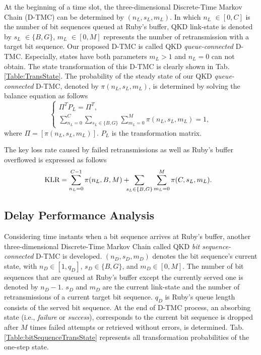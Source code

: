 \documentclass[conference]{IEEEtran}
\begin{document}
At the beginning of a time slot, the three-dimensional Discrete-Time Markov Chain (D-TMC) can be determined by $(n_L,s_L,m_L)$. In which $n_L$ $\in [0,C]$ is the number of bit sequences queued at Ruby's buffer, QKD link-state is denoted by $s_L$ $\in \{ B, G\}$, $m_L$ $\in [0,M]$ represents the number of retransmission with a target bit sequence. Our proposed D-TMC is called QKD \textit{queue-connected} D-TMC. Especially, states have both parameters $m_L>1$ and $n_L=0$ can not obtain. The state transformation of this D-TMC is clearly shown in Tab. \ref{Table:TransState}. The probability of the steady state of our QKD \textit{queue-connected} D-TMC, denoted by $\pi (n_L,s_L,m_L)$, is determined by solving the balance equation as follows
\begin{equation}
\label{eq:BalanceEquation}
\begin{cases}
 \Pi ^TP_L=\Pi ^T,\\
 \sum^{C}_{n_L=0}\sum_{s_L \in\{B,G\}}\sum_{m_L=0}^{M}\pi (n_L,s_L,m_L)=1,
\end{cases}
\end{equation}
where $\Pi=[\pi (n_L,s_L,m_L)]$. $P_L$ is the transformation matrix.

The key loss rate caused by failed retransmissions as well as Ruby's buffer overflowed is expressed as follows
\begin{equation}
	\!\!\!\!\textnormal{KLR}=\sum_{n_L=0}^{C-1}\pi (n_L,B,M)+\!\!\!\!\sum_{s_L\in\{B,G\}}\sum_{m_L=0}^{M}\pi(C,s_L,m_L).
\end{equation}

\subsection{Delay Performance Analysis}
\label{subsect:Delay}
Considering time instants when a bit sequence arrives at Ruby's buffer, another three-dimensional Discrete-Time Markov Chain called QKD \textit{bit sequence-connected} D-TMC is developed. $(n_D,s_D,m_D)$ denotes the bit sequence's current state, with $n_D \in [1,q_D]$, $s_D \in \{B,G\}$, and $m_D \in [0,M]$. The number of bit sequences that are queued at Ruby's buffer except the currently served one is denoted by $n_D-1$. $s_D$ and $m_D$ are the current link-state and the number of retransmissions of a current target bit sequence. $q_D$ is Ruby's queue length consists of the served bit sequence. At the end of D-TMC process, an absorbing state (i.e., \textit{failure} or \textit{success}), corresponds to the current bit sequence is dropped after $M$ times failed attempts or retrieved without errors, is determined. Tab. \ref{Table:bitSequenceTransState} represents all transformation probabilities of the one-step state. 
\end{document}
